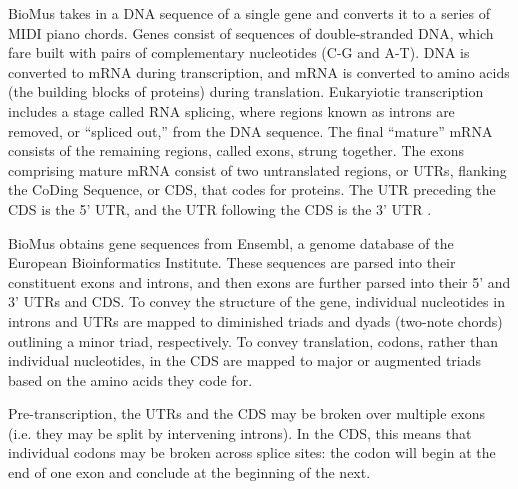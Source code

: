 \documentclass[letterpaper]{article}
\begin{document}
BioMus takes in a DNA sequence of a single gene and converts it to a series of MIDI piano chords. Genes consist of sequences of double-stranded DNA, which fare built with pairs of complementary nucleotides (C-G and A-T). 
DNA is converted to mRNA during transcription, and mRNA is converted to amino acids (the building blocks of proteins) during translation. Eukaryiotic transcription includes a stage called RNA splicing, where regions known as introns are removed, or “spliced out,” from the DNA sequence. The final “mature” mRNA consists of the remaining regions, called exons, strung together. The exons comprising mature mRNA consist of two untranslated regions, or UTRs, flanking the CoDing Sequence, or CDS, that codes for proteins. 
The UTR preceding the CDS is the 5’ UTR, and the UTR following the CDS is the 3’ UTR \cite{}.

BioMus obtains gene sequences from Ensembl, a genome database of the European Bioinformatics Institute. These sequences are parsed into their constituent exons and introns, and then exons are further parsed into their 5’ and 3’ UTRs and CDS. To convey the structure of the gene, individual nucleotides in introns and UTRs are mapped to diminished triads and dyads (two-note chords) outlining a minor triad, respectively. To convey translation, codons, rather than individual nucleotides, in the CDS are mapped to major or augmented triads based on the amino acids they code for.

Pre-transcription, the UTRs and the CDS may be broken over multiple exons (i.e. they may be split by intervening introns). In the CDS, this means that individual codons may be broken across splice sites: the codon will begin at the end of one exon and conclude at the beginning of the next.
\end{document}
